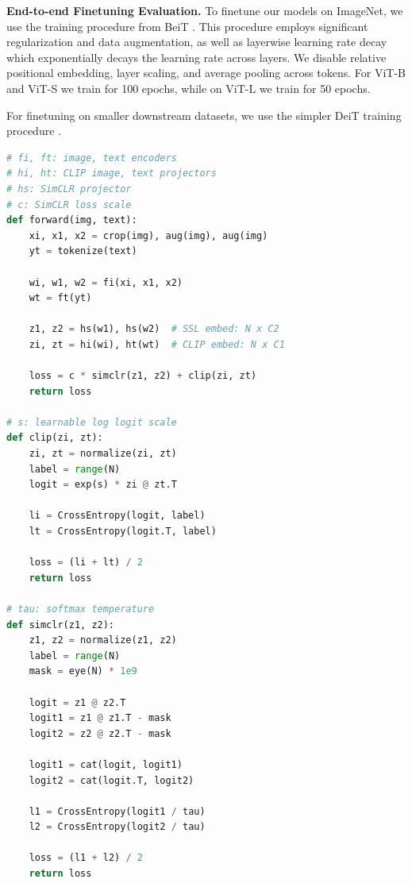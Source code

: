 \documentclass[10pt,twocolumn,letterpaper]{article}
\makeatletter
\let\@algcomment\relax
\newcommand\algcomment[1]{\def\@algcomment{\footnotesize#1}}
\renewcommand{\paragraph}[1]{\vspace{1.25mm}\noindent\textbf{#1}}
\makeatother
\begin{document}
\paragraph{End-to-end Finetuning Evaluation.} To finetune our models on ImageNet, we use the training procedure from BeiT \cite{Bao2021BEiTBP}.
This procedure employs significant regularization and data augmentation, as well as layerwise learning rate decay which exponentially decays the learning rate across layers.
We disable relative positional embedding, layer scaling, and average pooling across tokens.
For ViT-B and ViT-S we train for 100 epochs, while on ViT-L we train for 50 epochs.

For finetuning on smaller downstream datasets, we use the simpler DeiT training procedure \cite{Touvron2021TrainingDI}.

\begin{algorithm}[ht]
\caption{SLIP-SimCLR: PyTorch-like Pseudocode}
\label{alg:code}
\algcomment{
\textbf{Notes}: \texttt{@} is the matrix multiplication operator. \texttt{k.T} is \texttt{k}'s transpose.
\texttt{eye} constructs an identity matrix. \texttt{cat} concatenates two matrices. 
}
\begin{lstlisting}[language=python]
# fi, ft: image, text encoders
# hi, ht: CLIP image, text projectors
# hs: SimCLR projector
# c: SimCLR loss scale
def forward(img, text):
    xi, x1, x2 = crop(img), aug(img), aug(img)
    yt = tokenize(text)

    wi, w1, w2 = fi(xi, x1, x2)
    wt = ft(yt)

    z1, z2 = hs(w1), hs(w2)  # SSL embed: N x C2
    zi, zt = hi(wi), ht(wt)  # CLIP embed: N x C1

    loss = c * simclr(z1, z2) + clip(zi, zt)
    return loss

# s: learnable log logit scale
def clip(zi, zt):
    zi, zt = normalize(zi, zt)
    label = range(N)
    logit = exp(s) * zi @ zt.T

    li = CrossEntropy(logit, label)
    lt = CrossEntropy(logit.T, label)

    loss = (li + lt) / 2
    return loss

# tau: softmax temperature
def simclr(z1, z2):
    z1, z2 = normalize(z1, z2)
    label = range(N)
    mask = eye(N) * 1e9

    logit = z1 @ z2.T
    logit1 = z1 @ z1.T - mask
    logit2 = z2 @ z2.T - mask

    logit1 = cat(logit, logit1)
    logit2 = cat(logit.T, logit2)

    l1 = CrossEntropy(logit1 / tau)
    l2 = CrossEntropy(logit2 / tau)

    loss = (l1 + l2) / 2
    return loss
\end{lstlisting}
\end{algorithm}
\end{document}
